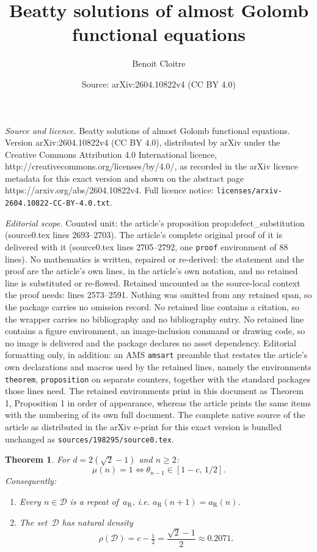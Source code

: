 \documentclass[10pt,a4paper]{amsart}
\title{Beatty solutions of almost Golomb functional equations}
\author{Benoit Cloitre}
\date{Source: arXiv:2604.10822v4 (CC BY 4.0)}
\newtheorem{theorem}{Theorem}
\begin{document}
\maketitle

\noindent\emph{Source and licence.} Beatty solutions of almost Golomb functional equations. Version arXiv:2604.10822v4 (CC BY 4.0), distributed by arXiv under the Creative Commons Attribution 4.0 International licence, http://creativecommons.org/licenses/by/4.0/, as recorded in the arXiv licence metadata for this exact version and shown on the abstract page https://arxiv.org/abs/2604.10822v4. Full licence notice: \texttt{licenses/arxiv-2604.10822-CC-BY-4.0.txt}.\par\smallskip

\noindent\textit{Editorial scope.} Counted unit: the article's proposition prop:defect\_substitution (source0.tex lines 2693--2703). The article's complete original proof of it is delivered with it (source0.tex lines 2705--2792, one \texttt{proof} environment of 88 lines). No mathematics is written, repaired or re-derived: the statement and the proof are the article's own lines, in the article's own notation, and no retained line is substituted or re-flowed.  Retained uncounted as the source-local context the proof needs: lines 2573--2591.  Nothing was omitted from any retained span, so the package carries no omission record.  No retained line contains a citation, so the wrapper carries no bibliography and no bibliography entry.  No retained line contains a figure environment, an image-inclusion command or drawing code, so no image is delivered and the package declares no asset dependency.  Editorial formatting only, in addition: an AMS \texttt{amsart} preamble that restates the article's own declarations and macros used by the retained lines, namely the environments \texttt{theorem}, \texttt{proposition} on separate counters, together with the standard packages those lines need.  The retained environments print in this document as Theorem 1, Proposition 1 in order of appearance, whereas the article prints the same items with the numbering of its own full document.  The complete native source of the article as distributed in the arXiv e-print for this exact version is bundled unchanged as \texttt{sources/198295/source0.tex}.
\begin{theorem}\label{thm:absorption}
For $d=2(\sqrt{2}{-}1)$ and $n\ge 2$:
\[
  \mu(n)=1\iff
  \theta_{n-1}\in[1-c,\,1/2].
\]
Consequently:
\begin{enumerate}
\item[\textup{(a)}] Every $n\in\mathcal{D}$ is a repeat
  of~$a_{\mathrm{R}}$, i.e.
  $a_{\mathrm{R}}(n{+}1)=a_{\mathrm{R}}(n)$.
\item[\textup{(b)}] The set~$\mathcal{D}$ has natural
  density
\[
  \rho(\mathcal{D})=c-\tfrac{1}{2}
  =\frac{\sqrt{2}-1}{2}\approx 0.2071.
\]
\end{enumerate}
\end{theorem}
\end{document}
